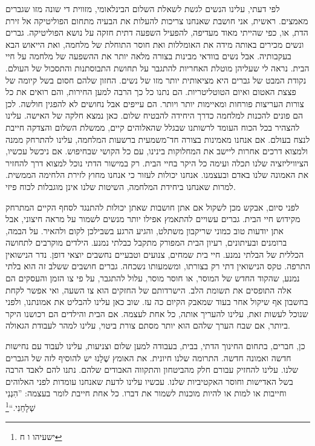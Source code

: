 \documentclass[14pt, article, extrafontsizes, twopage, a4paper]{memoir}
\begin{document}
לפי דעתי, עלינו הנשים לגשת לשאלת השלום הבינלאומי, מזווית די שונה מזו
שגברים מאמצים. ראשית, אני חושבת שאנחנו צריכות להעלות
את הבעיה מתחום הפוליטיקה אל זירת
הדת, או, כפי שהייתי מאוד מעדיפה, להפעיל
השפעה דתית חזקה על נושא הפוליטיקה. גברים
ונשים מכירים באותה מידה את האומללות ואת
חוסר התוחלת של מלחמה, ואת הייאוש הבא בעקבותיה.
אבל נשים בוודאי מבינות בצורה מלאה יותר את ההשפעה
של מלחמה על חיי הבית. נראה לי שעליהן מוטלת האחריות
להתגבר על תחושת התבוסתנות והתסכול של העולם. נקודת המבט של גברים היא
מציאותית יותר מזו של נשים. החזון שלהם
חסום בשל קיומה של פצצת האטום ואיום
הטוטליטריות. הם נתנו כל כך הרבה למען
החירות, והם רואים את כל צורות העריצות פורחות
ומאיימות יותר ויותר. הם עייפים אבל
נחושים לא להפגין חולשה. לכן הם פונים להכנות למלחמה
כדרך היחידה להבטיח שלום. כאן נמצא
חלקה של האישה. עלינו להצהיר בכל הכוח
העומד לרשותנו שבגלל שהאלוהים קיים, ממשלת השלום
והצדקה חייבת לנצח בעולם. אם אנחנו מאמינות בצורה חד־משמעית
ברשעות המלחמה, עלינו להתרחק ממנה
ולמצוא דרכים אחרות ליישב את המחלוקות בינינו,
עם כל הקושי שבחיפוש. אם ניכשל עכשיו, הציוויליזציה שלנו
תכלה ועימה כל היקר בחיי הבית.
רק במישור הדתי נוכל למצוא
דרך להחזיר את האמונה שלנו באדם ובעצמנו. אנחנו
יכולות לעזור כי אנחנו מחוץ לזירת הלחימה הממשית.
למרות שאנחנו ביחידת המלחמה, השיטות שלנו אינן
מוגבלות לכוח פיזי.

לפני סיום, אבקש מכן לשקול אם
אתן חושבות שאתן יכולות להתנגד לסחף הקיים המתרחק מקידוש חיי הבית. גברים עשויים להתאמץ אפילו יותר
מנשים לשמור על מראה חיצוני, אבל אתן יודעות טוב כמוני
שריקבון משתלט, והגיע הרגע
בשבילכן לקום ולהאיר. על הבמה,
ברומנים ובעיתונים, רעיון הבית המפורק
מתקבל כבלתי נמנע. הילדים מוקרבים
לתחושה הכללית של הבלתי נמנע.
חיי בית שמחים, צנועים וטבעיים נחשבים
יוצאי דופן. נדר הנישואין התרפה.
טקס הנישואין דתי רק בצורתו,
ומשמעותו נשכחה. גברים חושבים
ששלב זה הוא בלתי נמנע, שהקוד החדש של המוסר, או
חוסר מוסר, עלול להתגבר, על פי צו הזמן והעסקים הם אלה התופסים את תשומת הלב. הישרדותם של החזקים
הוא צו השעה, ואי אפשר לקחת בחשבון אף שיקול אחר
בעוד שמאבק הקיום כה עז. שוב כאן
עלינו להבליט את אמונתנו, ולפני שנוכל לעשות זאת, עלינו להעריך אותה,
כל אחת לעצמה. אם הבית והילדים
הם רכושנו היקר ביותר, אם שבח
הערך שלהם הוא יותר מסתם צורת ביטוי, עלינו
למהר לעבודת הגאולה.

כן, חברים, בתחום החינוך הדתי, בבית,
בעבודה למען שלום וצניעות, עלינו לעבוד עם
נחישות חדשה ואמונה חדשה. התרומה שלנו חיונית. את האומץ שֶׁלָנוּ
יש להוסיף לזה של הגברים שלנו. עלינו להחזיק
עבורם חלק מהביטחון והתקווה האבודים שלהם. נתנו
להם לאבד הרבה בשל האדישות וחוסר האקטיביות שלנו. עכשיו עלינו
לדעת שאנחנו עומדות לפני האלוהים וחייבות או למות
או להיות מוכנות לשמור את דברו. כל אחת חייבת לומר
בעצמה: ”הִנְנִי שְׁלָחֵנִי.“\footnote{ישעיהו ו ח}
\end{document}
